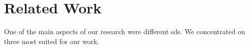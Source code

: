 \section{Related Work}\label{sec:relatedworks}

One of the main aspects of our research were different \glspl{sd}. We concentrated on three most suited for our work.





